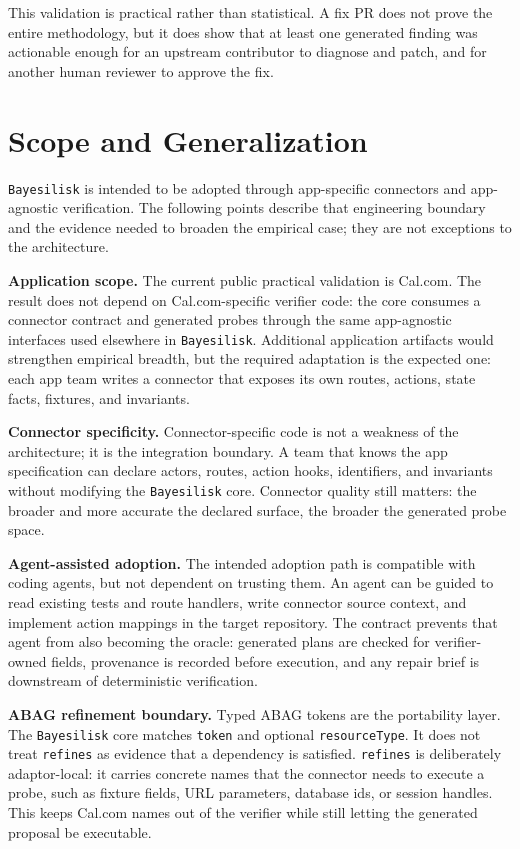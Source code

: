 \documentclass[10pt]{article}
\newcommand{\tool}{\texttt{Bayesilisk}\xspace}
\begin{document}
This validation is practical rather than statistical. A fix PR does not prove
the entire methodology, but it does show that at least one generated finding was
actionable enough for an upstream contributor to diagnose and patch, and for
another human reviewer to approve the fix.

\section{Scope and Generalization}

\tool is intended to be adopted through app-specific connectors and
app-agnostic verification. The following points describe that engineering
boundary and the evidence needed to broaden the empirical case; they are not
exceptions to the architecture.

\textbf{Application scope.} The current public practical validation is Cal.com.
The result does not depend on Cal.com-specific verifier code: the core consumes
a connector contract and generated probes through the same app-agnostic
interfaces used elsewhere in \tool. Additional application artifacts would
strengthen empirical breadth, but the required adaptation is the expected one:
each app team writes a connector that exposes its own routes, actions, state
facts, fixtures, and invariants.

\textbf{Connector specificity.} Connector-specific code is not a weakness of the
architecture; it is the integration boundary. A team that knows the app
specification can declare actors, routes, action hooks, identifiers, and
invariants without modifying the \tool core. Connector quality still matters:
the broader and more accurate the declared surface, the broader the generated
probe space.

\textbf{Agent-assisted adoption.} The intended adoption path is compatible with
coding agents, but not dependent on trusting them. An agent can be guided to
read existing tests and route handlers, write connector source context, and
implement action mappings in the target repository. The contract prevents that
agent from also becoming the oracle: generated plans are checked for
verifier-owned fields, provenance is recorded before execution, and any repair
brief is downstream of deterministic verification.

\textbf{ABAG refinement boundary.} Typed ABAG tokens are the portability layer.
The \tool core matches \texttt{token} and optional \texttt{resourceType}. It does
not treat \texttt{refines} as evidence that a dependency is satisfied.
\texttt{refines} is deliberately adaptor-local: it carries concrete names that
the connector needs to execute a probe, such as fixture fields, URL parameters,
database ids, or session handles. This keeps Cal.com names out of the verifier
while still letting the generated proposal be executable.
\end{document}
